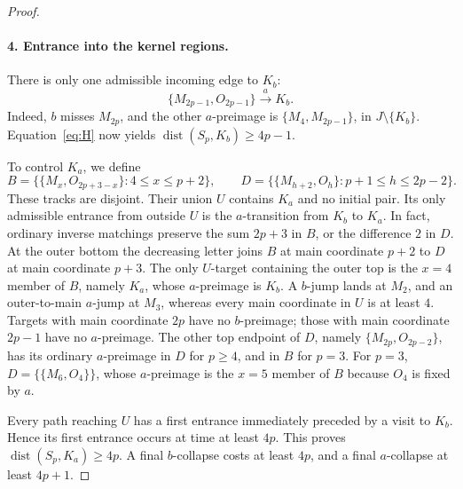 \documentclass[11pt]{article}
\newcommand{\dist}{\operatorname{dist}}
\newcommand{\M}[1]{M_{#1}}
\newcommand{\Ost}[1]{O_{#1}}
\newcommand{\pair}[2]{\{#1,#2\}}
\begin{document}
\begin{proof}
\paragraph{4. Entrance into the kernel regions.}
There is only one admissible incoming edge to $K_b$:
\begin{equation}\label{eq:Kbentry}
 \pair{\M{2p-1}}{\Ost{2p-1}}\xrightarrow{a}K_b.
\end{equation}
Indeed, $b$ misses $\M{2p}$, and the other $a$-preimage is $\pair{\M4}{\M{2p-1}}$, in $J\setminus\{K_b\}$. Equation~\eqref{eq:H} now yields $\dist(S_p,K_b)\geq4p-1$.

To control $K_a$, we define
\[
 B=\{\pair{\M x}{\Ost{2p+3-x}}:4\leq x\leq p+2\},\qquad
 D=\{\pair{\M{h+2}}{\Ost h}:p+1\leq h\leq2p-2\}.
\]
These tracks are disjoint. Their union $U$ contains $K_a$ and no initial pair. Its only admissible entrance from outside $U$ is the $a$-transition from $K_b$ to $K_a$. In fact, ordinary inverse matchings preserve the sum $2p+3$ in $B$, or the difference $2$ in $D$. At the outer bottom the decreasing letter joins $B$ at main coordinate $p+2$ to $D$ at main coordinate $p+3$. The only $U$-target containing the outer top is the $x=4$ member of $B$, namely $K_a$, whose $a$-preimage is $K_b$. A $b$-jump lands at $\M2$, and an outer-to-main $a$-jump at $\M3$, whereas every main coordinate in $U$ is at least $4$. Targets with main coordinate $2p$ have no $b$-preimage; those with main coordinate $2p-1$ have no $a$-preimage. The other top endpoint of $D$, namely $\pair{\M{2p}}{\Ost{2p-2}}$, has its ordinary $a$-preimage in $D$ for $p\geq4$, and in $B$ for $p=3$. For $p=3$, $D=\{\pair{\M6}{\Ost4}\}$, whose $a$-preimage is the $x=5$ member of $B$ because $\Ost4$ is fixed by $a$.

Every path reaching $U$ has a first entrance immediately preceded by a visit to $K_b$. Hence its first entrance occurs at time at least $4p$. This proves $\dist(S_p,K_a)\geq4p$. A final $b$-collapse costs at least $4p$, and a final $a$-collapse at least $4p+1$.


\end{proof}
\end{document}
